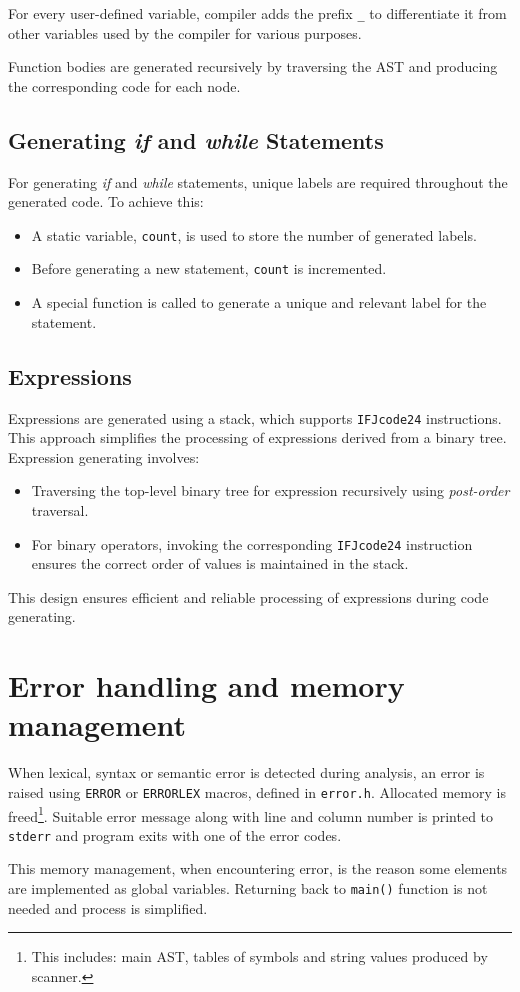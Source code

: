 \documentclass[a4paper, 11pt]{article}
\begin{document}
For every user-defined variable, compiler adds the prefix \verb|_| to differentiate it from other variables used by the compiler for various purposes.

Function bodies are generated recursively by traversing the \textsc{AST} and producing the corresponding code for each node.

\subsection{Generating \textit{if} and \textit{while} Statements}

For generating \textit{if} and \textit{while} statements, unique labels are required throughout the generated code. To achieve this:
\begin{itemize}
    \item A static variable, \verb|count|, is used to store the number of generated labels.
    \item Before generating a new statement, \verb|count| is incremented.
    \item A special function is called to generate a unique and relevant label for the statement.
\end{itemize}

\subsection{Expressions}

Expressions are generated using a stack, which supports \verb|IFJcode24| instructions. This approach simplifies the processing of expressions derived from a binary tree. Expression generating involves:
\begin{itemize}
    \item Traversing the top-level binary tree for expression recursively using \textit{post-order} traversal.
    \item For binary operators, invoking the corresponding \verb|IFJcode24| instruction ensures the correct order of values is maintained in the stack.
\end{itemize}

This design ensures efficient and reliable processing of expressions during code generating.


\section{Error handling and memory management}\label{sec:ERR}
When lexical, syntax or semantic error is detected during analysis, an error is raised using \verb|ERROR| or \verb|ERRORLEX| macros,
defined in \verb|error.h|. Allocated memory is freed\footnote{This includes: main AST, tables of symbols and string values produced by scanner.}.
Suitable error message along with line and column number is printed to \verb|stderr| and program exits with one of the error codes.
\par This memory management, when encountering error, is the reason some elements are implemented as global variables. 
Returning back to \verb|main()| function is not needed and process is simplified. 
\end{document}
